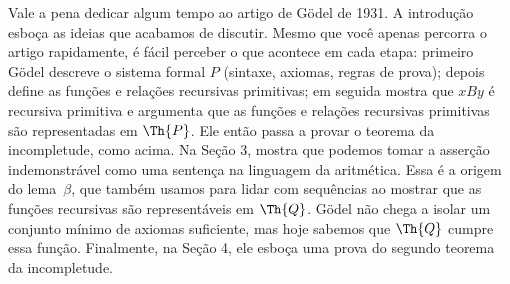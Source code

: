 \documentclass[../../../include/open-logic-section]{subfiles}
\begin{document}


Vale a pena dedicar algum tempo ao artigo de G\"odel de 1931. A introdução
esboça as ideias que acabamos de discutir. Mesmo que você apenas percorra o
artigo rapidamente, é fácil perceber o que acontece em cada etapa: primeiro
G\"odel descreve o sistema formal $P$ (sintaxe, axiomas, regras de prova);
depois define as funções e relações recursivas primitivas; em seguida mostra
que $x B y$ é recursiva primitiva e argumenta que as funções e relações
recursivas primitivas são representadas em $\Th{P}$. Ele então passa a
provar o teorema da incompletude, como acima. Na Seção 3, mostra que podemos
tomar a asserção indemonstrável como uma sentença na linguagem da
aritmética. Essa é a origem do lema~$\beta$, que também usamos para lidar
com sequências ao mostrar que as funções recursivas são representáveis em
$\Th{Q}$. G\"odel não chega a isolar um conjunto mínimo de axiomas
suficiente, mas hoje sabemos que $\Th{Q}$ cumpre essa função. Finalmente,
na Seção 4, ele esboça uma prova do segundo teorema da incompletude.
\end{document}
